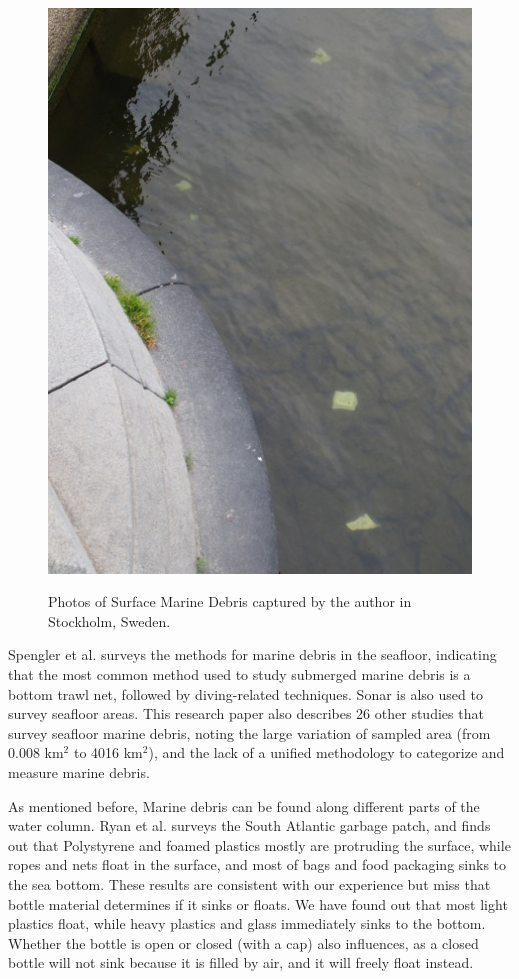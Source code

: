 \begin{figure}[tb]
{        \includegraphics[height = 0.11\textheight]{chapters/images/natural-garbage/stockholm-plastic-bags-cut.jpg}
    }
    \vspace*{0.5cm}
    \caption[Photos of Surface Marine Debris in Stockholm, Sweden]{Photos of Surface Marine Debris captured by the author in Stockholm, Sweden.}
    \label{md:stockholm}
\end{figure}

\newpage
Spengler et al. \cite{spengler2008methods} surveys the methods for marine debris in the seafloor, indicating that the most common method used to study submerged marine debris is a bottom trawl net, followed by diving-related techniques. Sonar is also used to survey seafloor areas. This research paper also describes 26 other studies that survey seafloor marine debris, noting the large variation of sampled area (from 0.008 km$^2$ to 4016 km$^2$), and the lack of a unified methodology to categorize and measure marine debris.

As mentioned before, Marine debris can be found along different parts of the water column. Ryan et al. \cite[-3em]{ryan2014litter} surveys the South Atlantic garbage patch, and finds out that Polystyrene and foamed plastics mostly are protruding the surface, while ropes and nets float in the surface, and most of bags and food packaging sinks to the sea bottom. These results are consistent with our experience but miss that bottle material determines if it sinks or floats. We have found out that most light plastics float, while heavy plastics and glass immediately sinks to the bottom. Whether the bottle is open or closed (with a cap) also influences, as a closed bottle will not sink because it is filled by air, and it will freely float instead.

